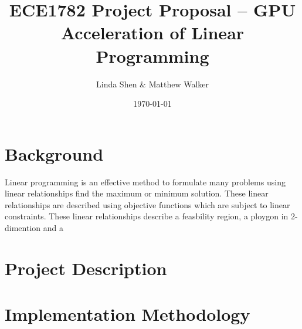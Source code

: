 \documentclass[12pt]{article}
\title{ECE1782 Project Proposal -- GPU Acceleration of Linear Programming}
\author{Linda Shen \& Matthew Walker}
\date{\today}
\begin{document}
\maketitle


\section{Background}

Linear programming is an effective method to formulate many problems using linear relationships find the maximum or minimum solution. These linear relationships are described using objective functions which are subject to linear constraints. These linear relationships describe a feasbility region, a ploygon in 2-dimention and a 

\section{Project Description}
\cite{EfficientSimplexCPUGPU}

\section{Implementation Methodology}


\printbibliography
\end{document}

